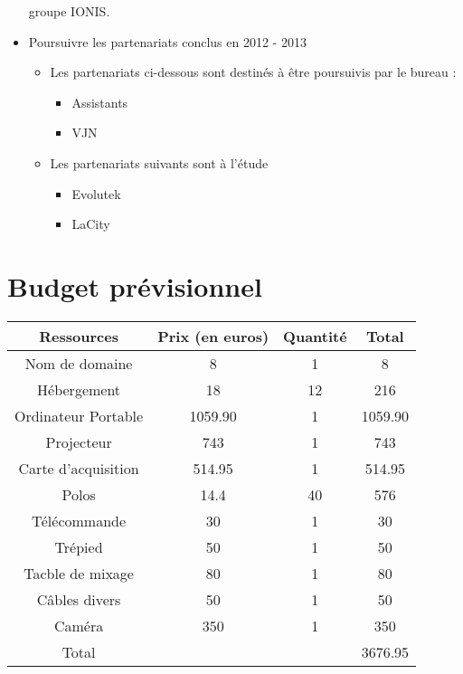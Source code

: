 \documentclass[12pt]{report}
\begin{document}
\begin{itemize}
      groupe IONIS.
    \item Poursuivre les partenariats conclus en 2012 - 2013
      \begin{itemize}
        \item Les partenariats ci-dessous sont destinés à être poursuivis par le bureau :
        \begin{itemize}
          \item Assistants
          \item VJN
        \end{itemize}
      \item Les partenariats suivants sont à l'étude
        \begin{itemize}
          \item Evolutek
          \item LaCity
        \end{itemize}
      \end{itemize}
  \end{itemize}
  \section{Budget prévisionnel}
  \begin{tabular}{|c|c|c|c|}
          \hline
          Ressources & Prix (en euros) & Quantité & Total\\
          \hline
          Nom de domaine & 8 & 1 & 8\\
          Hébergement & 18 & 12 & 216\\
          Ordinateur Portable & 1059.90 & 1 & 1059.90\\
          Projecteur & 743 & 1 & 743\\
          Carte d'acquisition & 514.95 & 1 & 514.95\\
          Polos & 14.4 & 40 & 576\\
          Télécommande & 30 & 1 & 30\\
          Trépied & 50 & 1 & 50\\
          Tacble de mixage & 80 & 1 & 80\\
          Câbles divers & 50 & 1 & 50\\
          Caméra & 350 & 1 & 350\\
          \hline
          Total &  & & 3676.95\\
          \hline
  \end{tabular}
\end{document}
